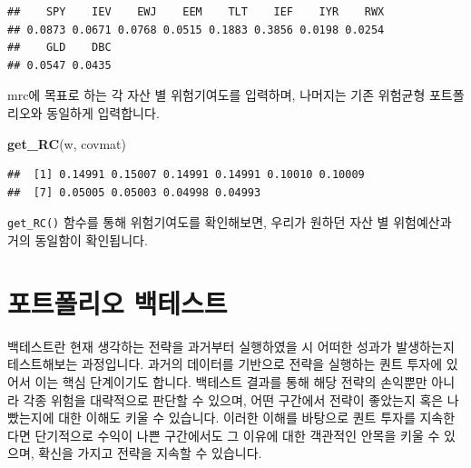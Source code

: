 \documentclass[12pt,]{book}
\newenvironment{Shaded}{\begin{snugshade}}{\end{snugshade}}
\newcommand{\DecValTok}[1]{\textcolor[rgb]{0.00,0.00,0.81}{#1}}
\newcommand{\KeywordTok}[1]{\textcolor[rgb]{0.13,0.29,0.53}{\textbf{#1}}}
\newcommand{\NormalTok}[1]{#1}
\newcommand{\OperatorTok}[1]{\textcolor[rgb]{0.81,0.36,0.00}{\textbf{#1}}}
\newcommand{\StringTok}[1]{\textcolor[rgb]{0.31,0.60,0.02}{#1}}
\begin{document}
\begin{Shaded}
\end{Shaded}

\begin{verbatim}
##    SPY    IEV    EWJ    EEM    TLT    IEF    IYR    RWX 
## 0.0873 0.0671 0.0768 0.0515 0.1883 0.3856 0.0198 0.0254 
##    GLD    DBC 
## 0.0547 0.0435
\end{verbatim}

mrc에 목표로 하는 각 자산 별 위험기여도를 입력하며, 나머지는 기존 위험균형 포트폴리오와 동일하게 입력합니다.

\begin{Shaded}
\begin{Highlighting}[]
\KeywordTok{get_RC}\NormalTok{(w, covmat)}
\end{Highlighting}
\end{Shaded}

\begin{verbatim}
##  [1] 0.14991 0.15007 0.14991 0.14991 0.10010 0.10009
##  [7] 0.05005 0.05003 0.04998 0.04993
\end{verbatim}

\texttt{get\_RC()} 함수를 통해 위험기여도를 확인해보면, 우리가 원하던 자산 별 위험예산과 거의 동일함이 확인됩니다.

\hypertarget{section-79}{%
\chapter{포트폴리오 백테스트}\label{section-79}}

백테스트란 현재 생각하는 전략을 과거부터 실행하였을 시 어떠한 성과가 발생하는지 테스트해보는 과정입니다. 과거의 데이터를 기반으로 전략을 실행하는 퀀트 투자에 있어서 이는 핵심 단계이기도 합니다. 백테스트 결과를 통해 해당 전략의 손익뿐만 아니라 각종 위험을 대략적으로 판단할 수 있으며, 어떤 구간에서 전략이 좋았는지 혹은 나빴는지에 대한 이해도 키울 수 있습니다. 이러한 이해를 바탕으로 퀀트 투자를 지속한다면 단기적으로 수익이 나쁜 구간에서도 그 이유에 대한 객관적인 안목을 키울 수 있으며, 확신을 가지고 전략을 지속할 수 있습니다.
\end{document}
